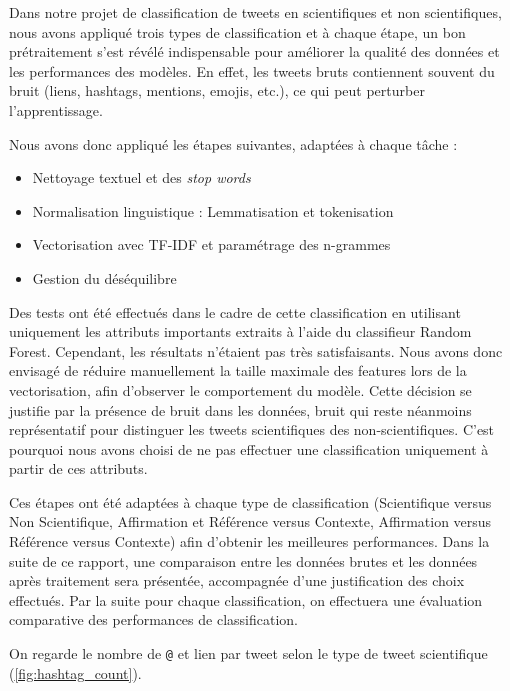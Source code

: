 Dans notre projet de classification de tweets en scientifiques et non scientifiques, nous avons appliqué trois types de classification et à chaque étape, un bon prétraitement s’est révélé indispensable pour améliorer la qualité des données et les performances des modèles.
En effet, les tweets bruts contiennent souvent du bruit (liens, hashtags, mentions, emojis, etc.), ce qui peut perturber l’apprentissage.

Nous avons donc appliqué les étapes suivantes, adaptées à chaque tâche :
\begin{itemize}
    \item Nettoyage textuel et des \textit{stop words}
    \item Normalisation linguistique : Lemmatisation et tokenisation
    \item Vectorisation avec TF-IDF et paramétrage des n-grammes
    \item Gestion du déséquilibre
\end{itemize}

Des tests ont été effectués dans le cadre de cette classification en utilisant uniquement les attributs importants extraits à l’aide du classifieur Random Forest.
Cependant, les résultats n’étaient pas très satisfaisants.
Nous avons donc envisagé de réduire manuellement la taille maximale des features lors de la vectorisation, afin d’observer le comportement du modèle.
Cette décision se justifie par la présence de bruit dans les données, bruit qui reste néanmoins représentatif pour distinguer les tweets scientifiques des non-scientifiques.
C’est pourquoi nous avons choisi de ne pas effectuer une classification uniquement à partir de ces attributs.

Ces étapes ont été adaptées à chaque type de classification (Scientifique versus Non Scientifique, Affirmation et Référence versus Contexte, Affirmation versus Référence versus Contexte) afin d’obtenir les meilleures performances.
Dans la suite de ce rapport, une comparaison entre les données brutes et les données après traitement sera présentée, accompagnée d’une justification des choix effectués.
Par la suite pour chaque classification, on effectuera une évaluation comparative des performances de classification.

On regarde le nombre de \texttt{@} et lien par tweet selon le type de tweet scientifique (\autoref{fig:hashtag_count}).

